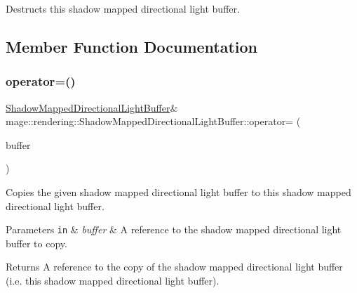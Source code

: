 Destructs this shadow mapped directional light buffer. 

\subsection{Member Function Documentation}
\hypertarget{structmage_1_1rendering_1_1_shadow_mapped_directional_light_buffer_ab124ed92e958ec42786045e1c235f54b}{}\label{structmage_1_1rendering_1_1_shadow_mapped_directional_light_buffer_ab124ed92e958ec42786045e1c235f54b} 
\subsubsection{\texorpdfstring{operator=()}{operator=()}\hspace{0.1cm}{\footnotesize\ttfamily [1/2]}}
{\footnotesize\ttfamily \hyperlink{structmage_1_1rendering_1_1_shadow_mapped_directional_light_buffer}{Shadow\+Mapped\+Directional\+Light\+Buffer}\& mage\+::rendering\+::\+Shadow\+Mapped\+Directional\+Light\+Buffer\+::operator= (\begin{DoxyParamCaption}\item[{const \hyperlink{structmage_1_1rendering_1_1_shadow_mapped_directional_light_buffer}{Shadow\+Mapped\+Directional\+Light\+Buffer} \&}]{buffer }\end{DoxyParamCaption})\hspace{0.3cm}{\ttfamily [default]}}

Copies the given shadow mapped directional light buffer to this shadow mapped directional light buffer.


\begin{DoxyParams}[1]{Parameters}
\mbox{\tt in}  & {\em buffer} & A reference to the shadow mapped directional light buffer to copy. \\
\hline
\end{DoxyParams}
\begin{DoxyReturn}{Returns}
A reference to the copy of the shadow mapped directional light buffer (i.\+e. this shadow mapped directional light buffer). 
\end{DoxyReturn}
\hypertarget{structmage_1_1rendering_1_1_shadow_mapped_directional_light_buffer_a85fdaabbf857d35be6874e94de4aa86e}{}\label{structmage_1_1rendering_1_1_shadow_mapped_directional_light_buffer_a85fdaabbf857d35be6874e94de4aa86e} 
